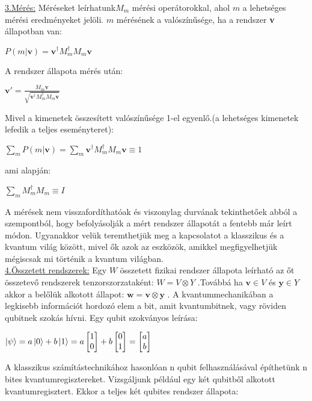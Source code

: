 \underline{3.Mérés:} Méréseket leírhatunk$M_m$  mérési operátorokkal, ahol $m$ a lehetséges mérési eredményeket jelöli. $m$ mérésének a valószínűsége, ha a rendszer \textbf{v} állapotban van:
\begin{center}
$P(m|\textbf{v})= {\textbf{v}}^\dagger M_m^\dagger M_m \textbf{v} $
\end{center}
A rendszer állapota mérés után:
\begin{center}
$ {\textbf{v}}' = \frac{M_m \textbf{v}}{\sqrt{{\textbf{v}}^\dagger M_m^\dagger M_m \textbf{v}}}  $
\end{center}
Mivel a kimenetek összesített valószínűsége 1-el egyenlő.(a lehetséges kimenetek lefedik a teljes eseményteret):
\begin{center}
$ \sum_m P(m|\textbf{v}) = \sum_m {\textbf{v}}^\dagger M_m^\dagger M_m \textbf{v} \equiv 1$
\end{center}
ami alapján:
\begin{center}
$\sum_m M_m^\dagger M_m \equiv I $
\end{center}
A mérések nem visszafordíthatóak és viszonylag durvának tekinthetőek abból a szempontból, hogy befolyásolják a mért rendszer állapotát a fentebb már leírt módon. Ugyanakkor velük teremthetjük meg a kapcsolatot a klasszikus és a kvantum világ között, mivel ők azok az eszközök,  amikkel megfigyelhetjük mégiscsak mi történik a kvantum világban.
\\
\underline{4.Összetett rendszerek:}
Egy $ W $ összetett fizikai rendszer állapota leírható az őt összetevő rendszerek tenzorszorzataként:
$ W=V \otimes Y $ .Továbbá ha $\textbf{v} \in V  $  és  $ \textbf{y} \in Y $ akkor a belőlük alkotott állapot: $ \textbf{w}=\textbf{v}\otimes \textbf{y} $ .
A kvantummechanikában a legkisebb információt hordozó elem a bit, amit kvantumbitnek, vagy röviden qubitnek  szokás hívni. Egy qubit szokványos leírása:
\begin{center}
$ \ket{\psi}=a\ket{0}+b\ket{1}=a \begin{bmatrix}1\\0\end{bmatrix}+ b \begin{bmatrix}0\\1\end{bmatrix} = \begin{bmatrix} a\\b \end{bmatrix} $
\end{center}
A klasszikus számítástechnikához hasonlóan n qubit felhasználásával építhetünk n bites kvantumregisztereket. Vizsgáljunk például egy két qubitből alkotott kvantumregisztert. Ekkor a teljes két qubites rendszer állapota:
